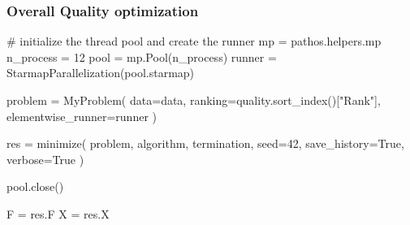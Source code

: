 \documentclass[
  letterpaper,
  DIV=11,
  numbers=noendperiod]{scrartcl}
\newenvironment{Shaded}{\begin{snugshade}}{\end{snugshade}}
\newcommand{\CommentTok}[1]{\textcolor[rgb]{0.37,0.37,0.37}{#1}}
\newcommand{\DecValTok}[1]{\textcolor[rgb]{0.68,0.00,0.00}{#1}}
\newcommand{\NormalTok}[1]{\textcolor[rgb]{0.00,0.23,0.31}{#1}}
\newcommand{\OperatorTok}[1]{\textcolor[rgb]{0.37,0.37,0.37}{#1}}
\newcommand{\StringTok}[1]{\textcolor[rgb]{0.13,0.47,0.30}{#1}}
\newcommand{\VariableTok}[1]{\textcolor[rgb]{0.07,0.07,0.07}{#1}}
\begin{document}
\subsubsection{Overall Quality
optimization}\label{overall-quality-optimization}

\begin{Shaded}
\begin{Highlighting}[]
\CommentTok{\# initialize the thread pool and create the runner}
\NormalTok{mp }\OperatorTok{=}\NormalTok{ pathos.helpers.mp}
\NormalTok{n\_process }\OperatorTok{=} \DecValTok{12}
\NormalTok{pool }\OperatorTok{=}\NormalTok{ mp.Pool(n\_process)}
\NormalTok{runner }\OperatorTok{=}\NormalTok{ StarmapParallelization(pool.starmap)}

\NormalTok{problem }\OperatorTok{=}\NormalTok{ MyProblem(}
\NormalTok{    data}\OperatorTok{=}\NormalTok{data, ranking}\OperatorTok{=}\NormalTok{quality.sort\_index()[}\StringTok{"Rank"}\NormalTok{], elementwise\_runner}\OperatorTok{=}\NormalTok{runner}
\NormalTok{)}

\NormalTok{res }\OperatorTok{=}\NormalTok{ minimize(}
\NormalTok{    problem, algorithm, termination, seed}\OperatorTok{=}\DecValTok{42}\NormalTok{, save\_history}\OperatorTok{=}\VariableTok{True}\NormalTok{, verbose}\OperatorTok{=}\VariableTok{True}
\NormalTok{)}

\NormalTok{pool.close()}

\NormalTok{F }\OperatorTok{=}\NormalTok{ res.F}
\NormalTok{X }\OperatorTok{=}\NormalTok{ res.X}
\end{Highlighting}
\end{Shaded}
\end{document}
